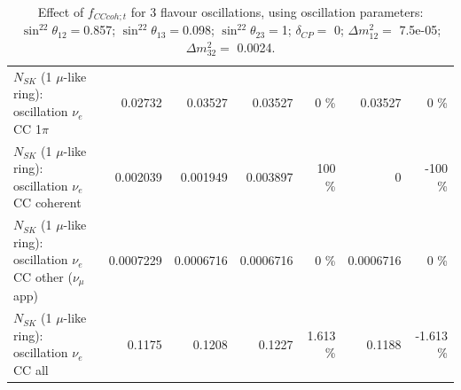 \begin{table}
\begin{tabular}{| l | r | r | r  r | r  r |}
                     $N_{SK}$ (1 $\mu$-like ring): oscillation $\nu_e$ CC 1$\pi$ &         0.02732 &         0.03527 &         0.03527 &        0 \%  &         0.03527 &        0 \%  \\ 
                   $N_{SK}$ (1 $\mu$-like ring): oscillation $\nu_e$ CC coherent &        0.002039 &        0.001949 &        0.003897 &      100 \%  &               0 &     -100 \%  \\ 
      $N_{SK}$ (1 $\mu$-like ring): oscillation $\nu_e$ CC other ($\nu_\mu$ app) &       0.0007229 &       0.0006716 &       0.0006716 &        0 \%  &       0.0006716 &        0 \%  \\ 
                       $N_{SK}$ (1 $\mu$-like ring): oscillation $\nu_e$  CC all &          0.1175 &          0.1208 &          0.1227 &    1.613 \%  &          0.1188 &   -1.613 \%  \\ 
\hline
\hline
\end{tabular}
\caption{ Effect of $f_{CCcoh; t}$ for 3 flavour oscillations, using oscillation parameters:  $\sin^22\theta_{12} = $0.857; $\sin^22\theta_{13} = $0.098; $\sin^22\theta_{23} = $1; $\delta_{CP} = $        0; $\Delta m^2_{12} = $    7.5e-05; $\Delta m^2_{32} = $    0.0024. }
\label{tab:num_xsec_norm_cccoh_1RmuT_3f_osc_t13:0.098}
\end{table}
\clearpage
